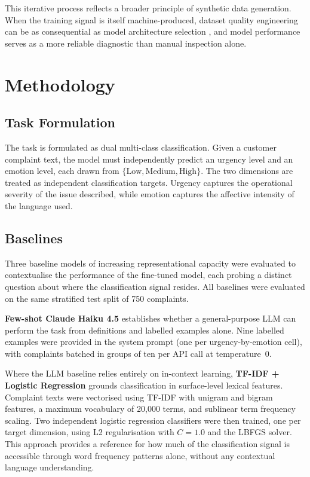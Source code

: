 \documentclass[11pt]{article}
\begin{document}
This iterative process reflects a broader principle of synthetic data generation. When
the training signal is itself machine-produced, dataset quality engineering can be as
consequential as model architecture selection \citep{iskander2024quality}, and model
performance serves as a more reliable diagnostic than manual inspection alone.

\section{Methodology}

\subsection{Task Formulation}

The task is formulated as dual multi-class classification. Given a customer complaint
text, the model must independently predict an urgency level and an emotion level, each
drawn from $\{\text{Low},\text{Medium},\text{High}\}$. The two dimensions are treated
as independent classification targets. Urgency captures the operational severity of the
issue described, while emotion captures the affective intensity of the language used.

\subsection{Baselines}

Three baseline models of increasing representational capacity were evaluated to
contextualise the performance of the fine-tuned model, each probing a distinct question
about where the classification signal resides. All baselines were evaluated on the same
stratified test split of 750 complaints.

\textbf{Few-shot Claude Haiku 4.5} establishes whether a general-purpose LLM can
perform the task from definitions and labelled examples alone. Nine labelled examples
were provided in the system prompt (one per urgency-by-emotion cell), with complaints
batched in groups of ten per API call at temperature~0.

Where the LLM baseline relies entirely on in-context learning, \textbf{TF-IDF +
Logistic Regression} grounds classification in surface-level lexical features.
Complaint texts were vectorised using TF-IDF with unigram and bigram features, a
maximum vocabulary of 20,000 terms, and sublinear term frequency scaling. Two
independent logistic regression classifiers were then trained, one per target dimension,
using L2 regularisation with $C{=}1.0$ and the LBFGS solver. This approach provides a
reference for how much of the classification signal is accessible through word frequency
patterns alone, without any contextual language understanding.
\end{document}
